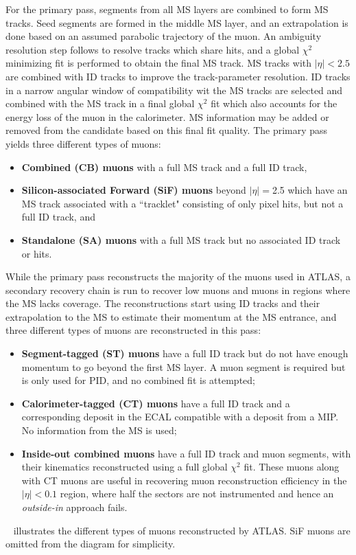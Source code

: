 For the primary pass, segments from all MS layers are combined to form MS tracks. Seed segments are formed in the middle MS layer, and an extrapolation is done based on an assumed parabolic trajectory of the muon. An ambiguity resolution step follows to resolve tracks which share hits, and a global $\chi^2$ minimizing fit is performed to obtain the final MS track. MS tracks with $|\eta|<2.5$ are combined with ID tracks to improve the track-parameter resolution. ID tracks in a narrow angular window of compatibility wit the MS tracks are selected and combined with the MS track in a final global $\chi^2$ fit which also accounts for the energy loss of the muon in the calorimeter. MS information may be added or removed from the candidate based on this final fit quality. The primary pass yields three different types of muons:
\begin{itemize}
    \item \textbf{Combined (CB) muons} with a full MS track and a full ID track,
    \item \textbf{Silicon-associated Forward (SiF) muons} beyond $|\eta|=$2.5 which have an MS track associated with a ``tracklet" consisting of only pixel hits, but not a full ID track, and
    \item \textbf{Standalone (SA) muons} with a full MS track but no associated ID track or hits.
\end{itemize}

While the primary pass reconstructs the majority of the muons used in ATLAS, a secondary recovery chain is run to recover low \pT muons and muons in regions where the MS lacks coverage. The reconstructions start using ID tracks and their extrapolation to the MS to estimate their momentum at the MS entrance, and three different types of muons are reconstructed in this pass:
\begin{itemize}
    \item \textbf{Segment-tagged (ST) muons} have a full ID track but do not have enough momentum to go beyond the first MS layer. A muon segment is required but is only used for PID, and no combined fit is attempted;
    \item \textbf{Calorimeter-tagged (CT) muons} have a full ID track and a corresponding deposit in the ECAL compatible with a deposit from a MIP. No information from the MS is used;
    \item \textbf{Inside-out combined muons} have a full ID track and muon segments, with their kinematics reconstructed using a full global $\chi^2$ fit. These muons along with CT muons are useful in recovering muon reconstruction efficiency in the $|\eta|<0.1$ region, where half the sectors are not instrumented and hence an \textit{outside-in} approach fails.
\end{itemize}
~ illustrates the different types of muons reconstructed by ATLAS. SiF muons are omitted from the diagram for simplicity.

